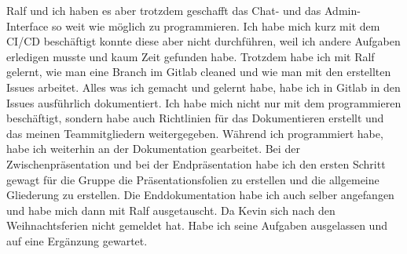 Ralf und ich haben es aber trotzdem geschafft das Chat- und das Admin- Interface so weit wie möglich zu programmieren.
Ich habe mich kurz mit dem CI/CD beschäftigt konnte diese aber nicht durchführen, weil ich andere Aufgaben erledigen musste und kaum Zeit gefunden habe.
Trotzdem habe ich mit Ralf gelernt, wie man eine Branch im Gitlab cleaned und wie man mit den erstellten Issues arbeitet.
Alles was ich gemacht und gelernt habe, habe ich in Gitlab in den Issues ausführlich dokumentiert. 
Ich habe mich nicht nur mit dem programmieren beschäftigt, sondern habe auch Richtlinien für das Dokumentieren erstellt und das meinen Teammitgliedern weitergegeben. 
Während ich programmiert habe, habe ich weiterhin an der Dokumentation gearbeitet.
Bei der Zwischenpräsentation und bei der Endpräsentation habe ich den ersten Schritt gewagt für die Gruppe die Präsentationsfolien zu erstellen und die allgemeine Gliederung zu erstellen.
Die Enddokumentation habe ich auch selber angefangen und habe mich dann mit Ralf ausgetauscht. 
Da Kevin sich nach den Weihnachtsferien nicht gemeldet hat. Habe ich seine Aufgaben ausgelassen und auf eine Ergänzung gewartet.\newline

